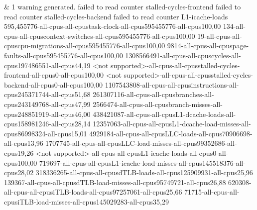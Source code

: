 &
1 warning generated. failed to read counter stalled-cycles-frontend failed to read counter stalled-cycles-backend failed to read counter L1-icache-loads 595,455776-all-cpus-all-cpustask-clock-all-cpus595455776-all-cpus100,00 134-all-cpus-all-cpuscontext-switches-all-cpus595455776-all-cpus100,00 19-all-cpus-all-cpuscpu-migrations-all-cpus595455776-all-cpus100,00 9814-all-cpus-all-cpuspage-faults-all-cpus595455776-all-cpus100,00 1308566491-all-cpus-all-cpuscycles-all-cpus197486551-all-cpus44,19 <not supported>-all-cpus-all-cpusstalled-cycles-frontend-all-cpus0-all-cpus100,00 <not supported>-all-cpus-all-cpusstalled-cycles-backend-all-cpus0-all-cpus100,00 1107543808-all-cpus-all-cpusinstructions-all-cpus245371744-all-cpus51,68 261307116-all-cpus-all-cpusbranches-all-cpus243149768-all-cpus47,99 2566474-all-cpus-all-cpusbranch-misses-all-cpus248851919-all-cpus46,00 438421087-all-cpus-all-cpusL1-dcache-loads-all-cpus158981246-all-cpus28,14 12357063-all-cpus-all-cpusL1-dcache-load-misses-all-cpus86998324-all-cpus15,01 4929184-all-cpus-all-cpusLLC-loads-all-cpus70906698-all-cpus13,96 1707745-all-cpus-all-cpusLLC-load-misses-all-cpus99352686-all-cpus19,26 <not supported>-all-cpus-all-cpusL1-icache-loads-all-cpus0-all-cpus100,00 719697-all-cpus-all-cpusL1-icache-load-misses-all-cpus145518376-all-cpus28,02 318336265-all-cpus-all-cpusdTLB-loads-all-cpus125909931-all-cpus25,96 139367-all-cpus-all-cpusdTLB-load-misses-all-cpus95749721-all-cpus26,88 620308-all-cpus-all-cpusiTLB-loads-all-cpus97257061-all-cpus25,66 71715-all-cpus-all-cpusiTLB-load-misses-all-cpus145029283-all-cpus35,29
